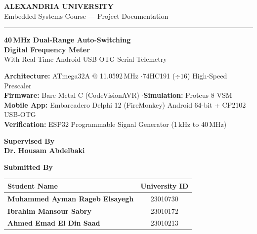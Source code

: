 \documentclass[11pt,a4paper]{article}
\begin{document}
\begin{titlepage}
    \centering
    \vspace*{0.4cm}
    {\Large\bfseries\color{NavyPrimary} ALEXANDRIA UNIVERSITY}\\[0.25cm]
    {\large\color{TealAccent} Embedded Systems Course --- Project Documentation}\\[0.4cm]
    {\color{TealAccent}\rule{\textwidth}{1.8pt}}

    \vspace{1.4cm}
    {\Huge\bfseries\color{NavyPrimary} 40\,MHz Dual-Range Auto-Switching\\[0.25cm]
    Digital Frequency Meter}\\[0.5cm]
    {\Large\color{gray} With Real-Time Android USB-OTG Serial Telemetry}

    \vspace{1.0cm}
    \begin{tcolorbox}[
        colback=SoftBg, colframe=NavyPrimary, width=0.92\textwidth,
        arc=4pt, boxrule=0.8pt, halign=center
    ]
        \textbf{Architecture:} ATmega32A @ 11.0592\,MHz \quad$\cdot$\quad 74HC191 ($\div 16$) High-Speed Prescaler\\
        \textbf{Firmware:} Bare-Metal C (CodeVisionAVR) \quad$\cdot$\quad \textbf{Simulation:} Proteus 8 VSM\\
        \textbf{Mobile App:} Embarcadero Delphi 12 (FireMonkey) Android 64-bit + CP2102 USB-OTG\\
        \textbf{Verification:} ESP32 Programmable Signal Generator (1\,kHz to 40\,MHz)
    \end{tcolorbox}

    \vspace{1.2cm}
    {\large\textbf{\color{NavyPrimary} Supervised By}}\\[0.2cm]
    {\Large\bfseries Dr. Housam Abdelbaki}

    \vspace{1.2cm}
    {\large\textbf{\color{NavyPrimary} Submitted By}}\\[0.35cm]
    \begin{tabular}{>{\bfseries}l c}
        \toprule
        \textbf{Student Name} & \textbf{University ID} \\
        \midrule
        Muhammed Ayman Rageb Elsayegh & 23010730 \\
        Ibrahim Mansour Sabry         & 23010172 \\
        Ahmed Emad El Din Saad        & 23010213 \\
        \bottomrule
    \end{tabular}


\end{titlepage}
\end{document}
